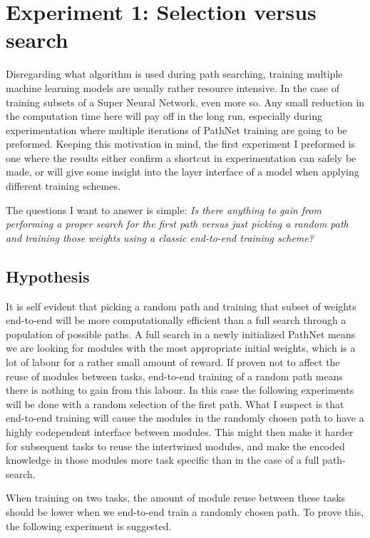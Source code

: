 \chapter{Experiment 1: Selection versus search}\label{exp1}
Disregarding what algorithm is used during path searching, training multiple machine learning models are usually rather resource intensive. In the case of training subsets of a Super Neural Network, even more so. Any small reduction in the computation time here will pay off in the long run, especially during experimentation where multiple iterations of PathNet training are going to be preformed. Keeping this motivation in mind, the first experiment I preformed is one where the results either confirm a shortcut in experimentation can safely be made, or will give some insight into the layer interface of a model when applying different training schemes.

The questions I want to answer is simple: \textit{Is there anything to gain from performing a proper search for the first path versus just picking a random path and training those weights using a classic end-to-end training scheme?}

\section{Hypothesis}
It is self evident that picking a random path and training that subset of weights end-to-end will be more computationally efficient than a full search through a population of possible paths. A full search in a newly initialized PathNet means we are looking for modules with the most appropriate initial weights, which is a lot of labour for a rather small amount of reward. If proven not to affect the reuse of modules between tasks, end-to-end training of a random path means there is nothing to gain from this labour. In this case the following experiments will be done with a random selection of the first path. 
What I suspect is that end-to-end training will cause the modules in the randomly chosen path to have a highly codependent interface between modules. This might then make it harder for subsequent tasks to reuse the intertwined modules, and make the encoded knowledge in those modules more task specific than in the case of a full path-search. 

When training on two tasks, the amount of module reuse between these tasks should be lower when we end-to-end train a randomly chosen path. To prove this, the following experiment is suggested. 

